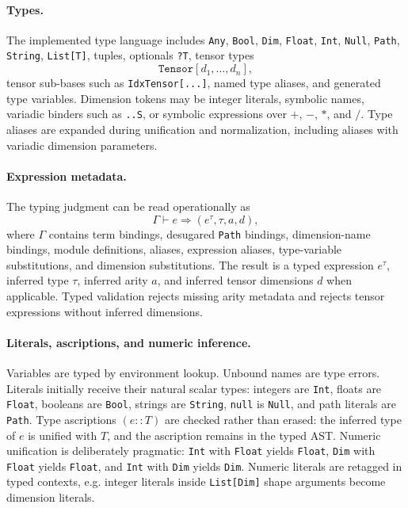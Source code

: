 \documentclass{article}
\newcommand{\code}[1]{\texttt{#1}}
\begin{document}
\paragraph{Types.}
The implemented type language includes \code{Any}, \code{Bool}, \code{Dim},
\code{Float}, \code{Int}, \code{Null}, \code{Path}, \code{String},
\code{List[T]}, tuples, optionals \code{?T}, tensor types
\[
  \code{Tensor}[d_1,\ldots,d_n],
\]
tensor sub-bases such as \code{IdxTensor[...]}, named type aliases, and
generated type variables.  Dimension tokens may be integer literals, symbolic
names, variadic binders such as \code{..S}, or symbolic expressions over
\(+\), \(-\), \(*\), and \(/\).  Type aliases are expanded during unification
and normalization, including aliases with variadic dimension parameters.

\paragraph{Expression metadata.}
The typing judgment can be read operationally as
\[
  \Gamma \vdash e \Rightarrow (e^\tau,\tau,a,d),
\]
where \(\Gamma\) contains term bindings, desugared \code{Path} bindings,
dimension-name bindings, module definitions, aliases, expression aliases,
type-variable substitutions, and dimension substitutions.  The result is a
typed expression \(e^\tau\), inferred type \(\tau\), inferred arity \(a\), and
inferred tensor dimensions \(d\) when applicable.  Typed validation rejects
missing arity metadata and rejects tensor expressions without inferred
dimensions.

\paragraph{Literals, ascriptions, and numeric inference.}
Variables are typed by environment lookup.  Unbound names are type errors.
Literals initially receive their natural scalar types: integers are
\code{Int}, floats are \code{Float}, booleans are \code{Bool}, strings are
\code{String}, \code{null} is \code{Null}, and path literals are \code{Path}.
Type ascriptions \((e :: T)\) are checked rather than erased: the inferred
type of \(e\) is unified with \(T\), and the ascription remains in the typed
AST.  Numeric unification is deliberately pragmatic: \code{Int} with
\code{Float} yields \code{Float}, \code{Dim} with \code{Float} yields
\code{Float}, and \code{Int} with \code{Dim} yields \code{Dim}.  Numeric
literals are retagged in typed contexts, e.g. integer literals inside
\code{List[Dim]} shape arguments become dimension literals.
\end{document}

